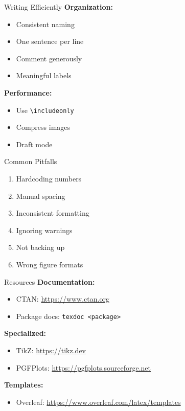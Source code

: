 \documentclass[aspectratio=169]{beamer}
\begin{document}
	\begin{frame}{Writing Efficiently}
		\textbf{Organization:}
		\begin{itemize}
			\item Consistent naming
			\item One sentence per line
			\item Comment generously
			\item Meaningful labels
		\end{itemize}
		
		\vspace{1em}
		
		\textbf{Performance:}
		\begin{itemize}
			\item Use \texttt{\textbackslash includeonly}
			\item Compress images
			\item Draft mode
		\end{itemize}
	\end{frame}
	
	\begin{frame}{Common Pitfalls}
		\begin{enumerate}
			\item Hardcoding numbers
			\item Manual spacing
			\item Inconsistent formatting
			\item Ignoring warnings
			\item Not backing up
			\item Wrong figure formats
		\end{enumerate}
	\end{frame}
	
	\begin{frame}{Resources}
		\textbf{Documentation:}
		\begin{itemize}
			\item CTAN: \url{https://www.ctan.org}
			\item Package docs: \texttt{texdoc <package>}
		\end{itemize}
		
		\vspace{0.5em}
		
		\textbf{Specialized:}
		\begin{itemize}
			\item TikZ: \url{https://tikz.dev}
			\item PGFPlots: \url{https://pgfplots.sourceforge.net}
		\end{itemize}
		
		\vspace{0.5em}
		
		\textbf{Templates:}
		\begin{itemize}
			\item Overleaf: \url{https://www.overleaf.com/latex/templates}
		\end{itemize}
	\end{frame}
	
\end{document}

